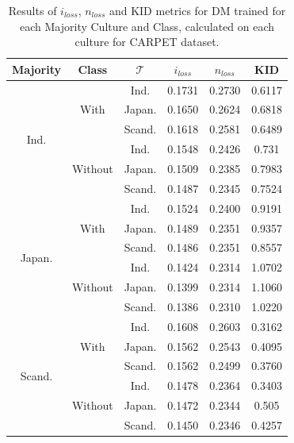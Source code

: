 \begin{table}[H]
\centering
\begin{tabular}{c|c|c|c|c|c}
    \textbf{Majority} & \textbf{Class} & \textbf{$\mathcal{T}$} & \textbf{$i_{loss}$} & \textbf{$n_{loss}$} & \textbf{KID} \\
    \toprule
\multirow{6}{*}{Ind.} & \multirow{3}{*}{With} & Ind. & 0.1731 & 0.2730 & 0.6117  \\
 &  & Japan. & 0.1650 & 0.2624 & 0.6818  \\
 &  & Scand. & 0.1618 & 0.2581 & 0.6489\\
\hhline{~-----}
 & \multirow{3}{*}{Without} & Ind. & 0.1548 & 0.2426 & 0.731  \\
 &  & Japan. & 0.1509 & 0.2385 & 0.7983  \\
 &  & Scand. & 0.1487 & 0.2345 & 0.7524  \\
\midrule
\multirow{6}{*}{Japan.} & \multirow{3}{*}{With} & Ind. & 0.1524 & 0.2400 & 0.9191  \\
 &  & Japan. & 0.1489 & 0.2351 & 0.9357  \\
 &  & Scand. & 0.1486 & 0.2351 & 0.8557  \\
\hhline{~-----}
 & \multirow{3}{*}{Without} & Ind. & 0.1424 & 0.2314 & 1.0702  \\
 &  & Japan. & 0.1399 & 0.2314 & 1.1060 \\
 &  & Scand. & 0.1386 & 0.2310 & 1.0220  \\
\midrule
\multirow{6}{*}{Scand.} & \multirow{3}{*}{With} & Ind. & 0.1608 & 0.2603 & 0.3162 \\
 &  & Japan. & 0.1562 & 0.2543 & 0.4095  \\
 &  & Scand. & 0.1562 & 0.2499 & 0.3760  \\
\hhline{~-----}
 & \multirow{3}{*}{Without} & Ind. & 0.1478 & 0.2364 & 0.3403  \\
 &  & Japan. & 0.1472 & 0.2344 & 0.505 \\
 &  & Scand. & 0.1450 & 0.2346 & 0.4257  \\
\bottomrule
    \end{tabular}
    \caption{Results of $i_{loss}$, $n_{loss}$ and KID metrics for DM trained for each Majority Culture and Class, calculated on each culture for CARPET dataset.}
    \label{ch3:tab:ris:dm:carpet}
\end{table}
%
%
